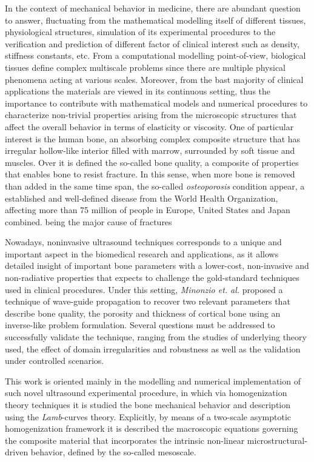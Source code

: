 \begin{intro}
In the context of mechanical behavior in medicine, there are abundant question to answer, fluctuating from the mathematical modelling itself of different tissues, physiological structures, simulation of its experimental procedures to the verification and prediction of different factor of clinical interest such as density, stiffness constants, etc. From a computational modelling point-of-view, biological tissues define complex multiscale problems since there are multiple physical phenomena acting at various scales. Moreover, from the bast majority of clinical applications the materials are viewed in its continuous setting, thus the importance to contribute with mathematical models and numerical procedures to characterize non-trivial properties arising from the microscopic structures that affect the overall behavior in terms of elasticity or viscosity.
One of particular interest is the human bone, an absorbing complex composite structure that has irregular hollow-like interior filled with marrow, surrounded by soft tissue and muscles. Over it is defined the so-called bone quality, a composite of properties that enables bone to resist fracture. In this sense, when more bone is removed than added in the same time span, the so-called \textit{osteoporosis} condition appear, a established and well-defined disease from the World Health Organization, affecting more than 75 million of people in Europe, United States and Japan combined. being the major cause of fractures

Nowadays, noninvasive ultrasound techniques corresponds to a unique and important aspect in the biomedical research and applications, as it allows detailed insight of important bone parameters with a lower-cost, non-invasive and non-radiative properties that expects to challenge the gold-standard techniques used in clinical procedures. Under this setting, \textit{Minonzio et. al.} \cite{Minonzio2018} proposed a technique of wave-guide propagation to recover two relevant parameters that describe bone quality, the porosity and thickness of cortical bone using an inverse-like problem formulation. Several questions must be addressed to successfully validate the technique, ranging from the studies of underlying theory used, the effect of domain irregularities and robustness as well as the validation under controlled scenarios.


This work is oriented mainly in the modelling and numerical implementation of such novel ultrasound experimental procedure, in which via homogenization theory techniques it is studied the bone mechanical behavior and  description using the \textit{Lamb}-curves theory. Explicitly, by means of a two-scale asymptotic homogenization framework it is described the macroscopic equations governing the composite material that incorporates the intrinsic non-linear microstructural-driven behavior, defined by the so-called mesoscale.


\end{intro}
